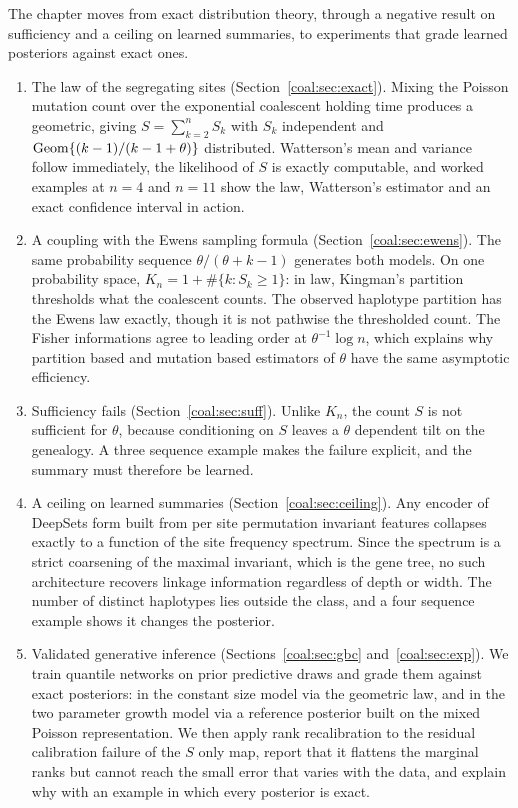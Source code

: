 The chapter moves from exact distribution theory, through a negative result on sufficiency and a ceiling on learned summaries, to experiments that grade learned posteriors against exact ones.

\begin{enumerate}
\item The law of the segregating sites (Section~\ref{coal:sec:exact}). Mixing the Poisson mutation count over the exponential coalescent holding time produces a geometric, giving $S=\sum_{k=2}^n S_k$ with $S_k$ independent and $\mathrm{Geom}\{(k-1)/(k-1+\theta)\}$ distributed. Watterson's mean and variance follow immediately, the likelihood of $S$ is exactly computable, and worked examples at $n=4$ and $n=11$ show the law, Watterson's estimator and an exact confidence interval in action.

\item A coupling with the Ewens sampling formula (Section~\ref{coal:sec:ewens}). The same probability sequence $\theta/(\theta+k-1)$ generates both models. On one probability space, $K_n = 1+\#\{k: S_k\ge 1\}$: in law, Kingman's partition thresholds what the coalescent counts. The observed haplotype partition has the Ewens law exactly, though it is not pathwise the thresholded count. The Fisher informations agree to leading order at $\theta^{-1}\log n$, which explains why partition based and mutation based estimators of $\theta$ have the same asymptotic efficiency.

\item Sufficiency fails (Section~\ref{coal:sec:suff}). Unlike $K_n$, the count $S$ is not sufficient for $\theta$, because conditioning on $S$ leaves a $\theta$ dependent tilt on the genealogy. A three sequence example makes the failure explicit, and the summary must therefore be learned.

\item A ceiling on learned summaries (Section~\ref{coal:sec:ceiling}). Any encoder of DeepSets form built from per site permutation invariant features collapses exactly to a function of the site frequency spectrum. Since the spectrum is a strict coarsening of the maximal invariant, which is the gene tree, no such architecture recovers linkage information regardless of depth or width. The number of distinct haplotypes lies outside the class, and a four sequence example shows it changes the posterior.

\item Validated generative inference (Sections~\ref{coal:sec:gbc} and~\ref{coal:sec:exp}). We train quantile networks on prior predictive draws and grade them against exact posteriors: in the constant size model via the geometric law, and in the two parameter growth model via a reference posterior built on the mixed Poisson representation. We then apply rank recalibration to the residual calibration failure of the $S$ only map, report that it flattens the marginal ranks but cannot reach the small error that varies with the data, and explain why with an example in which every posterior is exact.
\end{enumerate}

